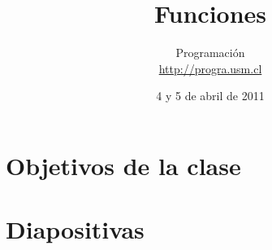 \documentclass[10pt]{article}
\title{Funciones}
\author{Programación \\ \url{http://progra.usm.cl}}
\date{4 y 5 de abril de 2011}
\begin{document}
  \maketitle

  \section*{Objetivos de la clase}

  \section*{Diapositivas}
\end{document}
